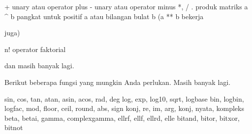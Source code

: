 \documentclass[12pt,arial,letterpaper]{book}
\begin{document}
\begin{eulernootebook}
\begin{eulercomment}
\begin{eulercomment}
\begin{eulernootebook}
\begin{eulercomment}
\end{eulercomment}
\begin{eulerttcomment}
 + unary atau operator plus
 - unary atau operator minus
 *, /
 . produk matriks
 a ^ b pangkat untuk positif a atau bilangan bulat b (a ** b bekerja
\end{eulerttcomment}
\begin{eulercomment}
juga)\\
\end{eulercomment}
\begin{eulerttcomment}
 n! operator faktorial
\end{eulerttcomment}
\begin{eulercomment}

dan masih banyak lagi.

Berikut beberapa fungsi yang mungkin Anda perlukan. Masih banyak lagi.

\end{eulercomment}
\begin{eulerttcomment}
 sin, cos, tan, atan, asin, acos, rad, deg
 log, exp, log10, sqrt, logbase
 bin, logbin, logfac, mod, floor, ceil, round, abs, sign
 konj, re, im, arg, konj, nyata, kompleks
 beta, betai, gamma, complexgamma, ellrf, ellf, ellrd, elle
 bitand, bitor, bitxor, bitnot
\end{eulerttcomment}
\begin{eulercomment}


\end{eulercomment}
\end{eulernootebook}
\end{eulercomment}
\end{eulercomment}
\end{eulernootebook}
\end{document}
